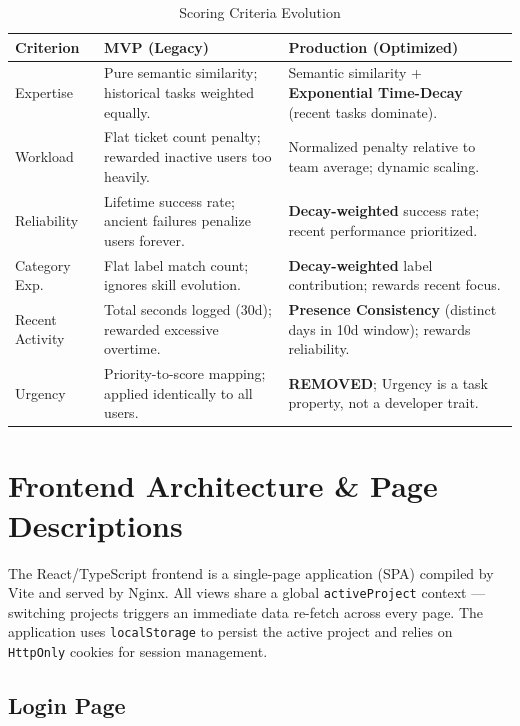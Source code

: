 \documentclass[12pt, a4paper]{article}
\begin{document}
\begin{table}[H]
\centering
\caption{Scoring Criteria Evolution}
\begin{tabularx}{\textwidth}{|l|X|X|}
\hline
\textbf{Criterion} & \textbf{MVP (Legacy)} & \textbf{Production (Optimized)} \\
\hline
Expertise        & Pure semantic similarity; historical tasks weighted equally. & Semantic similarity + \textbf{Exponential Time-Decay} (recent tasks dominate). \\
Workload         & Flat ticket count penalty; rewarded inactive users too heavily. & Normalized penalty relative to team average; dynamic scaling. \\
Reliability      & Lifetime success rate; ancient failures penalize users forever. & \textbf{Decay-weighted} success rate; recent performance prioritized. \\
Category Exp.    & Flat label match count; ignores skill evolution. & \textbf{Decay-weighted} label contribution; rewards recent focus. \\
Recent Activity  & Total seconds logged (30d); rewarded excessive overtime. & \textbf{Presence Consistency} (distinct days in 10d window); rewards reliability. \\
Urgency          & Priority-to-score mapping; applied identically to all users. & \textbf{REMOVED}; Urgency is a task property, not a developer trait. \\
\hline
\end{tabularx}
\end{table}



\section{Frontend Architecture \& Page Descriptions}

The React/TypeScript frontend is a single-page application (SPA) compiled by Vite and served by Nginx. All views share a global \texttt{activeProject} context — switching projects triggers an immediate data re-fetch across every page. The application uses \texttt{localStorage} to persist the active project and relies on \texttt{HttpOnly} cookies for session management.

\subsection{Login Page}
\end{document}
